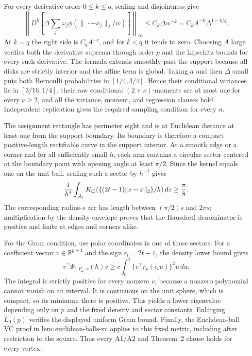For every derivative order \(0\leq k\leq q\), scaling and disjointness give
\[
 \left\|D^k\left[\Delta\sum_j\omega_j\phi(\lVert\,\cdot-x_j\rVert_2/w)\right]\right\|_\infty
 \leq C_k\Delta w^{-k}=C_kA^{-k}\Delta^{1-k/q}.
\]
At \(k=q\) the right side is \(C_qA^{-q}\), and for \(k<q\) it tends to zero.  Choosing \(A\) large verifies both the derivative suprema through order \(p\) and the Lipschitz bounds for every such derivative.  The formula extends smoothly past the support because all disks are strictly interior and the affine term is global.  Taking \(a\) and then \(\Delta\) small puts both Bernoulli probabilities in \([1/4,3/4]\).  Hence their conditional variances lie in \([3/16,1/4]\), their raw conditional \((2+\nu)\)-moments are at most one for every \(\nu\geq2\), and all the variance, moment, and regression clauses hold.  Independent replication gives the required sampling condition for every \(n\).

The assignment rectangle has perimeter eight and is at Euclidean distance at least one from the support boundary.  Its boundary is therefore a compact positive-length rectifiable curve in the support interior.  At a smooth edge or a corner and for all sufficiently small \(h\), each arm contains a circular sector centered at the boundary point with opening angle at least \(\pi/2\).  Since the kernel equals one on the unit ball, scaling such a sector by \(h^{-1}\) gives
\[
 {1\over h^2}\int_{\mathcal A_t}K_\square(\{(2t-1)\lVert z-x\rVert_2\}/h)\,dz\geq {\pi\over8}.
\]
The corresponding radius-\(s\) arc has length between \((\pi/2)s\) and \(2\pi s\); multiplication by the density envelope proves that the Hausdorff denominator is positive and finite at edges and corners alike.

For the Gram condition, use polar coordinates in one of those sectors.  For a coefficient vector \(v\in\mathbb R^{p+1}\) and the sign \(\epsilon_t=2t-1\), the density lower bound gives
\[
 v^\top\Psi_{t,P_\omega,x}(h)v
 \geq c\int_0^1\{v^\top r_p(\epsilon_tu)\}^2u\,du.
\]
The integral is strictly positive for every nonzero \(v\), because a nonzero polynomial cannot vanish on an interval.  It is continuous on the unit sphere, which is compact, so its minimum there is positive.  This yields a lower eigenvalue depending only on \(p\) and the fixed density and sector constants.  Enlarging \(L_0(p)\) verifies the displayed uniform Gram bound.  Finally, the Euclidean-ball VC proof in \(\mathrm{lem:euclidean\text{-}balls\text{-}vc}\) applies to this fixed metric, including after restriction to the square.  Thus every A1/A2 and Theorem~2 clause holds for every vertex.

